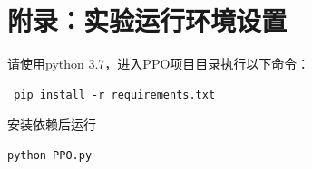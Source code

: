 \documentclass{article}
\begin{document}
\section{附录：实验运行环境设置}
请使用python 3.7，进入PPO项目目录执行以下命令：
\begin{lstlisting}
 pip install -r requirements.txt
\end{lstlisting}
安装依赖后运行
\begin{lstlisting}
python PPO.py
\end{lstlisting}




\end{document}
